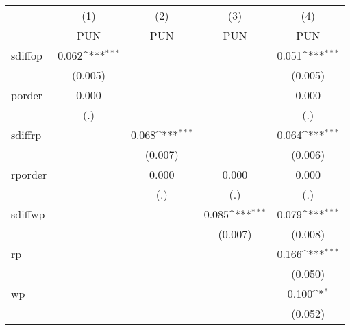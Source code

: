 {
\def\sym#1{\ifmmode^{#1}\else\(^{#1}\)\fi}
\begin{tabular}{l*{4}{c}}
\toprule
                    &\multicolumn{1}{c}{(1)}&\multicolumn{1}{c}{(2)}&\multicolumn{1}{c}{(3)}&\multicolumn{1}{c}{(4)}\\
                    &\multicolumn{1}{c}{PUN}&\multicolumn{1}{c}{PUN}&\multicolumn{1}{c}{PUN}&\multicolumn{1}{c}{PUN}\\
\midrule
sdiffop             &       0.062\sym{***}&                     &                     &       0.051\sym{***}\\
                    &     (0.005)         &                     &                     &     (0.005)         \\
\addlinespace
porder              &       0.000         &                     &                     &       0.000         \\
                    &         (.)         &                     &                     &         (.)         \\
\addlinespace
sdiffrp             &                     &       0.068\sym{***}&                     &       0.064\sym{***}\\
                    &                     &     (0.007)         &                     &     (0.006)         \\
\addlinespace
rporder             &                     &       0.000         &       0.000         &       0.000         \\
                    &                     &         (.)         &         (.)         &         (.)         \\
\addlinespace
sdiffwp             &                     &                     &       0.085\sym{***}&       0.079\sym{***}\\
                    &                     &                     &     (0.007)         &     (0.008)         \\
\addlinespace
rp                  &                     &                     &                     &       0.166\sym{***}\\
                    &                     &                     &                     &     (0.050)         \\
\addlinespace
wp                  &                     &                     &                     &       0.100\sym{*}  \\
                    &                     &                     &                     &     (0.052)         \\

\end{tabular}}
